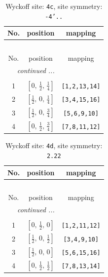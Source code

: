 \documentclass[fleqn,8pt]{jsarticle}
\begin{document}
\renewcommand{\arraystretch}{1.2}
\begin{longtable}{ccc}
\caption{Wyckoff site: {\tt 4c}, site symmetry: {\tt -4'..}}
 \\
 \hline \hline
No. & position & mapping \\ \hline \endfirsthead

\multicolumn{2}{l}{\tablename\ \thetable{}} \\
 \hline \hline
No. & position & mapping \\ \hline \endhead

 \hline \hline
\multicolumn{2}{r}{\footnotesize\it continued ...} \\ \endfoot

 \hline \hline
\multicolumn{2}{r}{} \\ \endlastfoot

1 & $\left[ 0,\, \frac{1}{2},\, \frac{1}{4} \right]$ & {\tt [1,2,13,14]} \\ \hline
2 & $\left[ \frac{1}{2},\, 0,\, \frac{1}{4} \right]$ & {\tt [3,4,15,16]} \\ \hline
3 & $\left[ \frac{1}{2},\, 0,\, \frac{3}{4} \right]$ & {\tt [5,6,9,10]} \\ \hline
4 & $\left[ 0,\, \frac{1}{2},\, \frac{3}{4} \right]$ & {\tt [7,8,11,12]} \\
\end{longtable}
\renewcommand{\arraystretch}{1.2}
\begin{longtable}{ccc}
\caption{Wyckoff site: {\tt 4d}, site symmetry: {\tt 2.22}}
 \\
 \hline \hline
No. & position & mapping \\ \hline \endfirsthead

\multicolumn{2}{l}{\tablename\ \thetable{}} \\
 \hline \hline
No. & position & mapping \\ \hline \endhead

 \hline \hline
\multicolumn{2}{r}{\footnotesize\it continued ...} \\ \endfoot

 \hline \hline
\multicolumn{2}{r}{} \\ \endlastfoot

1 & $\left[ 0,\, \frac{1}{2},\, 0 \right]$ & {\tt [1,2,11,12]} \\ \hline
2 & $\left[ \frac{1}{2},\, 0,\, \frac{1}{2} \right]$ & {\tt [3,4,9,10]} \\ \hline
3 & $\left[ \frac{1}{2},\, 0,\, 0 \right]$ & {\tt [5,6,15,16]} \\ \hline
4 & $\left[ 0,\, \frac{1}{2},\, \frac{1}{2} \right]$ & {\tt [7,8,13,14]} \\
\end{longtable}
\end{document}
